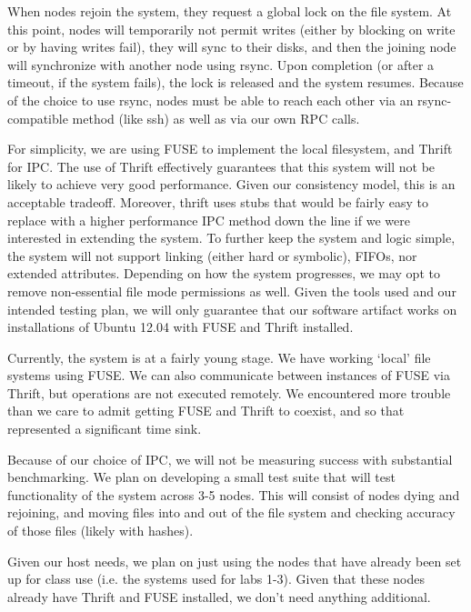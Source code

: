When nodes rejoin the system, they request a global lock on the file system. At
this point, nodes will temporarily not permit writes (either by blocking on
write or by having writes fail), they will sync to their disks, and then the
joining node will synchronize with another node using rsync. Upon completion (or
after a timeout, if the system fails), the lock is released and the system
resumes. Because of the choice to use rsync, nodes must be able to reach each
other via an rsync-compatible method (like ssh) as well as via our own RPC
calls.

For simplicity, we are using FUSE to implement the local filesystem, and Thrift
for IPC. The use of Thrift effectively guarantees that this system will not be
likely to achieve very good performance. Given our consistency model, this is an
acceptable tradeoff. Moreover, thrift uses stubs that would be fairly easy to
replace with a higher performance IPC method down the line if we were interested
in extending the system. To further keep the system and logic simple, the system
will not support linking (either hard or symbolic), FIFOs, nor extended
attributes. Depending on how the system progresses, we may opt to remove
non-essential file mode permissions as well. Given the tools used and our
intended testing plan, we will only guarantee that our software artifact works
on installations of Ubuntu  12.04 with FUSE and Thrift installed.

Currently, the system is at a fairly young stage. We have working ‘local’ file
systems using FUSE. We can also communicate between instances of FUSE via
Thrift, but operations are not executed remotely. We encountered more trouble
than we care to admit getting FUSE and Thrift to coexist, and so that
represented a significant time sink.

Because of our choice of IPC, we will not be measuring success with substantial
benchmarking. We plan on developing a small test suite that will test
functionality of the system across 3-5 nodes. This will consist of nodes dying
and rejoining, and moving files into and out of the file system and checking
accuracy of those files (likely with hashes).

Given our host needs, we plan on just using the nodes that have already been set
up for class use (i.e. the systems used for labs 1-3). Given that these nodes
already have Thrift and FUSE installed, we don’t need anything additional.

